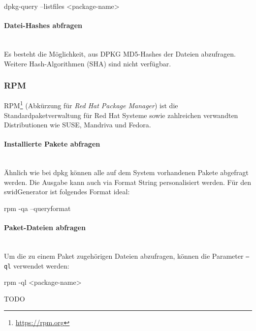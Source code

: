\begin{bashcode}
dpkg-query --listfiles <package-name>
\end{bashcode}

\paragraph{Datei-Hashes abfragen} \hspace{0pt} \\

\noindent Es besteht die Möglichkeit, aus DPKG MD5-Hashes der Dateien abzufragen. Weitere
Hash-Algorithmen (\zb SHA) sind nicht verfügbar.


\subsubsection{RPM}

RPM\footnote{\url{https://rpm.org}} (Abkürzung für
\textit{Red Hat Package Manager}) ist die Standardpaketverwaltung für Red Hat Systeme sowie zahlreichen verwandten Distributionen wie SUSE, Mandriva und Fedora.

\paragraph{Installierte Pakete abfragen} \hspace{0pt} \\

\noindent Ähnlich wie bei dpkg können alle auf dem System vorhandenen Pakete abgefragt werden. Die Ausgabe kann auch via Format String personalisiert werden. Für den swidGenerator ist folgendes Format ideal:

\begin{bashcode}
rpm -qa --queryformat %
\end{bashcode}

\paragraph{Paket-Dateien abfragen} \hspace{0pt} \\

\noindent Um die zu einem Paket zugehörigen Dateien abzufragen, können die Parameter \texttt{--ql} verwendet werden:

\begin{bashcode}
rpm -ql <package-name>
\end{bashcode}

\noindent TODO
